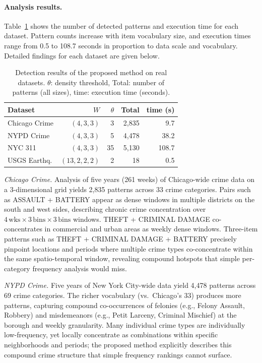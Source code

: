 \paragraph{Analysis results.}
Table~\ref{tab:realdata_npatterns} shows the number of detected patterns
and execution time for each dataset.
Pattern counts increase with item vocabulary size,
and execution times range from 0.5 to 108.7 seconds
in proportion to data scale and vocabulary.
Detailed findings for each dataset are given below.

\begin{table}[h]
\centering
\caption{Detection results of the proposed method on real datasets.
  $\theta$: density threshold,
  Total: number of patterns (all sizes),
  time: execution time (seconds).}
\label{tab:realdata_npatterns}
\small
\begin{tabular}{lrrrr}
\toprule
Dataset & $W$ & $\theta$ & Total & time (s) \\
\midrule
Chicago Crime  & $(4,3,3)$    &   3 & 2,835 &   9.7 \\
NYPD Crime     & $(4,3,3)$    &   5 & 4,478 &  38.2 \\
NYC 311        & $(4,3,3)$    &  35 & 5,130 & 108.7 \\
USGS Earthq.   & $(13,2,2,2)$ &   2 &    18 &   0.5 \\
\bottomrule
\end{tabular}
\end{table}

\emph{Chicago Crime.}
Analysis of five years (261 weeks) of Chicago-wide crime data
on a 3-dimensional grid yields 2,835 patterns across 33 crime categories.
Pairs such as ASSAULT + BATTERY appear as dense windows
in multiple districts on the south and west sides,
describing chronic crime concentration over $4\,\mathrm{wks} \times 3\,\mathrm{bins} \times 3\,\mathrm{bins}$ windows.
THEFT + CRIMINAL DAMAGE co-concentrates in commercial and urban areas
as weekly dense windows.
Three-item patterns such as THEFT + CRIMINAL DAMAGE + BATTERY
precisely pinpoint locations and periods where multiple crime types
co-concentrate within the same spatio-temporal window,
revealing compound hotspots that simple per-category frequency analysis would miss.

\emph{NYPD Crime.}
Five years of New York City-wide data yield 4,478 patterns across 69 crime categories.
The richer vocabulary (vs.\ Chicago's 33) produces more patterns,
capturing compound co-occurrences of felonies (e.g., Felony Assault, Robbery)
and misdemeanors (e.g., Petit Larceny, Criminal Mischief)
at the borough and weekly granularity.
Many individual crime types are individually low-frequency,
yet locally concentrate as combinations within specific neighborhoods and periods;
the proposed method explicitly describes this compound crime structure
that simple frequency rankings cannot surface.

